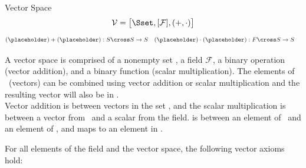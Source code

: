 \newpage
\begin{mathbox}{Vector Space}
	\begin{equation*}
		\mathcal{V}=\big[\Sset,[\mathcal{F}], (+,\cdot)\big]
	\end{equation*}
	\begin{align*}
	(\placeholder)+(\placeholder):S\cross S&\rightarrow S
	&
	(\placeholder)\cdot(\placeholder):F\cross S&\rightarrow S
	\end{align*}
\end{mathbox}
A vector space is comprised of a nonempty set \Sset, a field \(\mathcal{F}\), a binary operation (vector addition), and a binary function (scalar multiplication).
The elements of \Vset\ (vectors) can be combined using vector addition or scalar multiplication and the resulting vector will also be in \Vset. 
\\
Vector addition is between vectors in the set \Vset, and the scalar multiplication is between a vector from \Vset\ and a scalar from the field. is between an element of \Fset\ and an element of \Vset, and maps to an element in \Vset .

For all elements of the field and the vector space, the following vector axioms hold:

